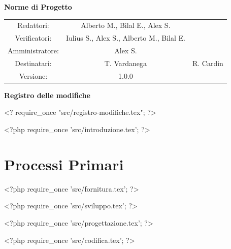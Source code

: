 \documentclass[a4paper, 11pt]{article}
\begin{document}
\begin{center}
\begin{Huge}
        \textbf{Norme di Progetto} \\
        \vspace{4mm}

\end{Huge}

\vspace{20mm}

\begin{large}
\begin{spacing}{1.4}
\begin{tabular}{c c c}
   Redattori: & Alberto M., Bilal E., Alex S. & \\
   Verificatori: & Iulius S., Alex S., Alberto M., Bilal E. & \\
   Amministratore: & Alex S. & \\
   Destinatari: & T. Vardanega & R. Cardin \\
   Versione: & 1.0.0 &
\end{tabular}
\end{spacing}
\end{large}
\end{center}

\pagebreak

\begin{huge}
    \textbf{Registro delle modifiche}
\end{huge}
\vspace{5pt}

<? require_once "src/registro-modifiche.tex"; ?>

\pagebreak
\tableofcontents
\pagebreak

<?php require_once 'src/introduzione.tex'; ?>
\pagebreak

\section{Processi Primari}

<?php require_once 'src/fornitura.tex'; ?>

<?php require_once 'src/sviluppo.tex'; ?>

<?php require_once 'src/progettazione.tex'; ?>


<?php require_once 'src/codifica.tex'; ?>

\pagebreak
\end{document}
